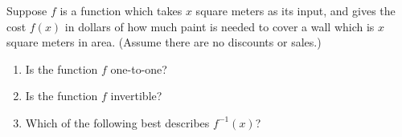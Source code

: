 \documentclass{ximera}
\author{Alexander Goldman}
\begin{document}
Suppose $f$ is a function which takes $x$ square meters as its input, and gives the cost $f(x)$ in dollars of how much paint is needed to cover a wall which is $x$ square meters in area. (Assume there are no discounts or sales.)

\begin{exercise}

\begin{enumerate}
\item Is the function $f$ one-to-one?
\begin{multipleChoice}
\end{multipleChoice}

\item Is the function $f$ invertible?
\begin{multipleChoice}
\end{multipleChoice}

\item Which of the following best describes $f^{-1}(x)$?
\begin{multipleChoice}
\end{multipleChoice}
\end{enumerate}

\end{exercise}
\end{document}
